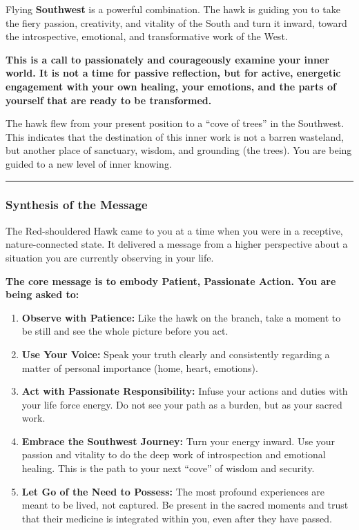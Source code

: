 \documentclass{article}
\begin{document}
Flying \textbf{Southwest} is a powerful combination. The hawk is guiding
you to take the fiery passion, creativity, and vitality of the South and
turn it inward, toward the introspective, emotional, and transformative
work of the West.

\textbf{This is a call to passionately and courageously examine your
inner world. It is not a time for passive reflection, but for active,
energetic engagement with your own healing, your emotions, and the parts
of yourself that are ready to be transformed.}

The hawk flew from your present position to a ``cove of trees'' in the
Southwest. This indicates that the destination of this inner work is not
a barren wasteland, but another place of sanctuary, wisdom, and
grounding (the trees). You are being guided to a new level of inner
knowing.

\begin{center}\rule{0.5\linewidth}{0.5pt}\end{center}

\subsubsection*{Synthesis of the
Message}\label{synthesis-of-the-message}

The Red-shouldered Hawk came to you at a time when you were in a
receptive, nature-connected state. It delivered a message from a higher
perspective about a situation you are currently observing in your life.

\textbf{The core message is to embody Patient, Passionate Action. You
are being asked to:}

\begin{enumerate}
\def\labelenumi{\arabic{enumi}.}
\item
  \textbf{Observe with Patience:} Like the hawk on the branch, take a
  moment to be still and see the whole picture before you act.
\item
  \textbf{Use Your Voice:} Speak your truth clearly and consistently
  regarding a matter of personal importance (home, heart, emotions).
\item
  \textbf{Act with Passionate Responsibility:} Infuse your actions and
  duties with your life force energy. Do not see your path as a burden,
  but as your sacred work.
\item
  \textbf{Embrace the Southwest Journey:} Turn your energy inward. Use
  your passion and vitality to do the deep work of introspection and
  emotional healing. This is the path to your next ``cove'' of wisdom
  and security.
\item
  \textbf{Let Go of the Need to Possess:} The most profound experiences
  are meant to be lived, not captured. Be present in the sacred moments
  and trust that their medicine is integrated within you, even after
  they have passed.
\end{enumerate}
\end{document}
